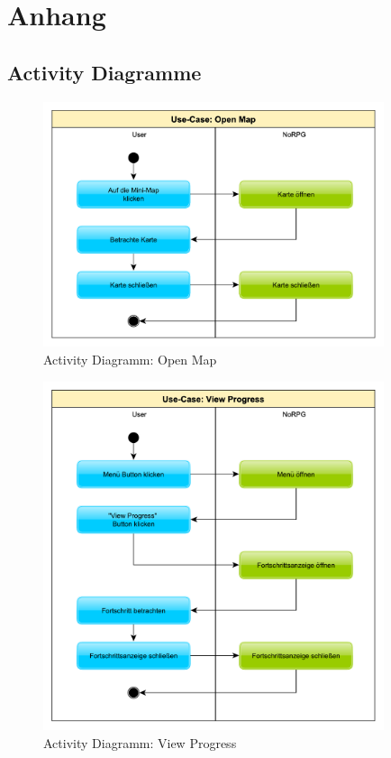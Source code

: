 
\chapter*{Anhang}
\section*{Activity Diagramme}
	\begin{figure}[htbp]
		\centering 
		\label{umlOpenMap}
		\includegraphics[width=10cm]{pics/OpenMap.pdf}
		\caption{Activity Diagramm: Open Map}
	\end{figure}

	\begin{figure}[htbp]
		\centering 
		\label{umlViewProgess}
		\includegraphics[width=10cm]{pics/ViewProgress.pdf}
		\caption{Activity Diagramm: View Progress}
	\end{figure}